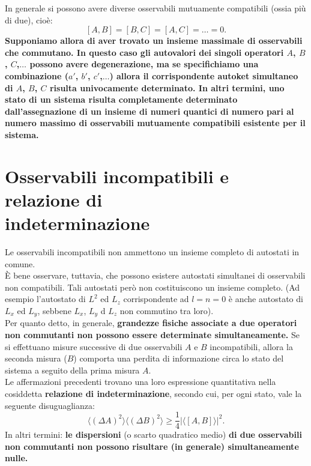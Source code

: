 In generale si possono avere diverse osservabili mutuamente compatibili (ossia più di due), cioè:
\begin{equation}
\left[A,B\right]=\left[B,C\right]=\left[A,C\right]=\dots =0.
\end{equation}
\textbf{Supponiamo allora di aver trovato un insieme massimale di osservabili che commutano. In questo caso gli autovalori dei singoli operatori $A$, $B$, $C$,$\dots$ possono avere degenerazione, ma se specifichiamo una combinazione ($a'$, $b'$, $c'$,$\dots$) allora il corrispondente autoket simultaneo di $A$, $B$, $C$ risulta univocamente determinato. In altri termini, uno stato di un sistema risulta completamente determinato dall'assegnazione di un insieme di numeri quantici di numero pari al numero massimo di osservabili mutuamente compatibili esistente per il sistema.}
\section[Osservabili incompatibili e relazione di indeterminazione]{Osservabili incompatibili e relazione di\\ indeterminazione}
Le osservabili incompatibili non ammettono un insieme completo di autostati in comune.\\
È bene osservare, tuttavia, che possono esistere autostati simultanei di osservabili non compatibili. Tali autostati però non costituiscono un insieme completo. (Ad esempio l'autostato di $L^2$ ed $L_z$ corrispondente ad $l=n=0$ è anche autostato di $L_x$ ed $L_y$, sebbene $L_x$, $L_y$ d $L_z$ non commutino tra loro).\\
Per quanto detto, in generale, \textbf{grandezze fisiche associate a due operatori non commutanti non possono essere determinate simultaneamente.} Se si effettuano misure successive di due osservabili $A$ e $B$ incompatibili, allora la seconda misura ($B$) comporta una perdita di informazione circa lo stato del sistema a seguito della prima misura $A$.\\
Le affermazioni precedenti trovano una loro espressione quantitativa nella cosiddetta \textbf{relazione di indeterminazione}, secondo cui, per ogni stato, vale la seguente disuguaglianza:
\begin{equation}
\label{eq:cap4_2}
\langle \left( \Delta A \right) ^2 \rangle \langle \left( \Delta B \right) ^2 \rangle \geq\frac{1}{4}\vert \langle \left[A,B \right] \rangle \vert ^2.
\end{equation}
In altri termini: \textbf{le dispersioni} (o scarto quadratico medio) \textbf{di due osservabili non commutanti non possono risultare (in generale) simultaneamente nulle.}
